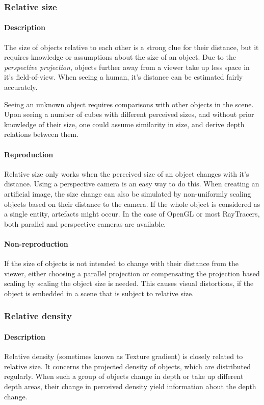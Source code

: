 \subsubsection{Relative size}
\paragraph{Description}
The size of objects relative to each other is a strong clue for their distance, but it requires knowledge or assumptions about the size of an object. Due to the \textit{perspective projection}, objects further away from a viewer take up less space in it's field-of-view. When seeing a human, it's distance can be estimated fairly accurately.

Seeing an unknown object requires comparisons with other objects in the scene. Upon seeing a number of cubes with different perceived sizes, and without prior knowledge of their size, one could assume similarity in size, and derive depth relations between them.

\paragraph{Reproduction}
Relative size only works when the perceived size of an object changes with it's distance. Using a perspective camera is an easy way to do this. When creating an artificial image, the size change can also be simulated by non-uniformly scaling objects based on their distance to the camera. If the whole object is considered as a single entity, artefacts might occur. In the case of OpenGL or most RayTracers, both parallel and perspective cameras are available.

\paragraph{Non-reproduction}
If the size of objects is not intended to change with their distance from the viewer, either choosing a parallel projection or compensating the projection based scaling by scaling the object size is needed. This causes visual distortions, if the object is embedded in a scene that is subject to relative size.


\subsubsection{Relative density}
\paragraph{Description}
Relative density (sometimes known as Texture gradient) is closely related to relative size.
It concerns the projected density of objects, which are distributed regularly.
When such a group of objects change in depth or take up different depth areas, their change in perceived density yield information about the depth change.

